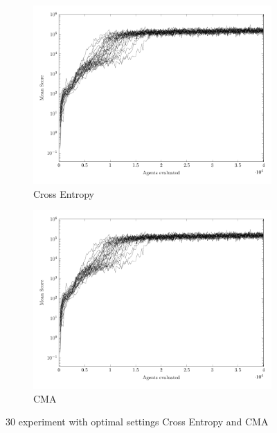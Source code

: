 \begin{figure}[H]
	\centering
	\captionsetup[subfigure]{justification=centering}
    \begin{subfigure}[b]{0.49\textwidth}
    	\caption{Cross Entropy}
        \includegraphics[width=\textwidth]{data/TunedComparison/CE_Optimal_Bertsekas_NormalTetris/PlotFile.pdf}
    \end{subfigure} 
    \begin{subfigure}[b]{0.49\textwidth}
    	\caption{CMA}
        \includegraphics[width=\textwidth]{data/TunedComparison/CE_Optimal_Bertsekas_NormalTetris/PlotFile.pdf}
    \end{subfigure}

    \caption{30 experiment with optimal settings Cross Entropy and CMA}
\end{figure}

